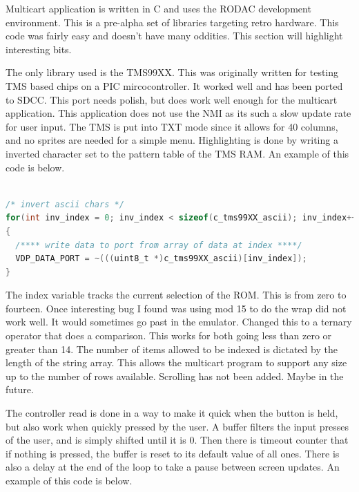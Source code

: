 \documentclass{article}
\begin{document}
  \par
  Multicart application is written in C and uses the RODAC development environment. This is a pre-alpha set of libraries targeting retro hardware.
  This code was fairly easy and doesn't have many oddities. This section will highlight interesting bits.

  \par
  The only library used is the TMS99XX. This was originally written for testing TMS based chips on a PIC mircocontroller. It worked well and has been
  ported to SDCC. This port needs polish, but does work well enough for the multicart application. This application does not use the NMI as its such
  a slow update rate for user input. The TMS is put into TXT mode since it allows for 40 columns, and no sprites are needed for a simple menu.
  Highlighting is done by writing a inverted character set to the pattern table of the TMS RAM. An example of this code is below.

  \begin{lstlisting}[language=C]

/* invert ascii chars */
for(int inv_index = 0; inv_index < sizeof(c_tms99XX_ascii); inv_index++)
{
  /**** write data to port from array of data at index ****/
  VDP_DATA_PORT = ~(((uint8_t *)c_tms99XX_ascii)[inv_index]);
}
  \end{lstlisting}

  \par
  The index variable tracks the current selection of the ROM. This is from zero to fourteen. Once interesting bug I found was using mod 15 to do the wrap did
  not work well. It would sometimes go past in the emulator. Changed this to a ternary operator that does a comparison. This works for both going
  less than zero or greater than 14. The number of items allowed to be indexed is dictated by the length of the string array.
  This allows the multicart program to support any size up to the number of rows available. Scrolling has not been added. Maybe in the future.
  \par
  The controller read is done in a way to make it quick when the button is held, but also work when quickly pressed by the user. A buffer filters the input
  presses of the user, and is simply shifted until it is 0. Then there is timeout counter that if nothing is pressed, the buffer is reset to its default value
  of all ones. There is also a delay at the end of the loop to take a pause between screen updates. An example of this code is below.
\end{document}
